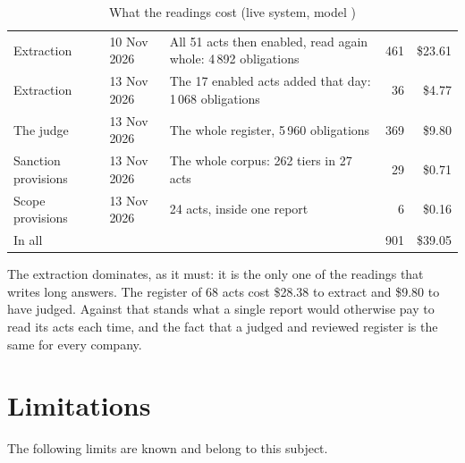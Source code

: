 \begin{table}[H]
\caption{What the readings cost (live system, model )}\label{tab:obligations:cost}
\begin{tabularx}{\textwidth}{@{}L{38mm}L{22mm}Yrr@{}}
\toprule
{} &  &  &  &  \\
\midrule
Extraction & 10 Nov 2026 & All 51 acts then enabled, read again whole: 4\,892 obligations & 461 & \$23.61 \\
Extraction & 13 Nov 2026 & The 17 enabled acts added that day: 1\,068 obligations & 36 & \$4.77 \\
The judge & 13 Nov 2026 & The whole register, 5\,960 obligations & 369 & \$9.80 \\
Sanction provisions & 13 Nov 2026 & The whole corpus: 262 tiers in 27 acts & 29 & \$0.71 \\
Scope provisions & 13 Nov 2026 & 24 acts, inside one report & 6 & \$0.16 \\
\midrule
In all & & & 901 & \$39.05 \\
\bottomrule
\end{tabularx}
\end{table}

The extraction dominates, as it must: it is the only one of the readings that writes long
answers. The register of 68 acts cost \$28.38 to extract and \$9.80 to have judged. Against
that stands what a single report would otherwise pay to read its acts each time, and the
fact that a judged and reviewed register is the same for every company.


\section{Limitations}\label{sec:obligations:limits}

The following limits are known and belong to this subject.

